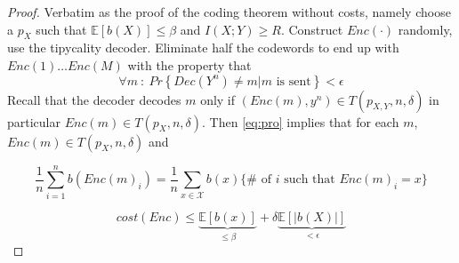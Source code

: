 \documentclass[twoside]{article}
\theoremstyle{definition} %
\renewcommand{\Pr}[1]{Pr\left\{#1\right\}}
\newcommand{\Ex}[1]{\mathbb{E}\left[#1\right]}
\def\X{\mathcal{X}}
\begin{document}
\begin{proof}
  Verbatim as the proof of the coding theorem without costs, namely choose a $p_X$ such that $\Ex{b(X)} \leq \beta$ and $I(X;Y) \geq R$. Construct $Enc(\cdot)$ randomly, use the tipycality decoder. Eliminate half the codewords to end up with $Enc(1) \dots Enc(M)$ with the property that
  \begin{equation}
    \label{eq:pro}
    \forall m~:~\Pr{Dec(Y^n) \not = m | m \text{ is sent}} < \epsilon
  \end{equation}
  Recall that the decoder decodes $m$ only if $(Enc(m), y^n) \in T(p_{X,Y}, n, \delta)$ in particular $Enc(m) \in T(p_X, n, \delta)$. Then \cref{eq:pro} implies that for each $m$, $Enc(m) \in T(p_X, n, \delta)$ and

  \[
    \frac 1 n \sum_{i=1}^n b(Enc(m)_i) = \frac 1 n \sum_{x\in \X} b(x) \{ \# \text{ of } i \text{ such that } Enc(m)_i = x\}
  \]

  \[
    cost(Enc) \leq \underbrace{\Ex{b(x)}}_{\leq \beta} + \delta \underbrace{\Ex{|b(X)|}}_{< \epsilon}
  \]
\end{proof}
\end{document}
